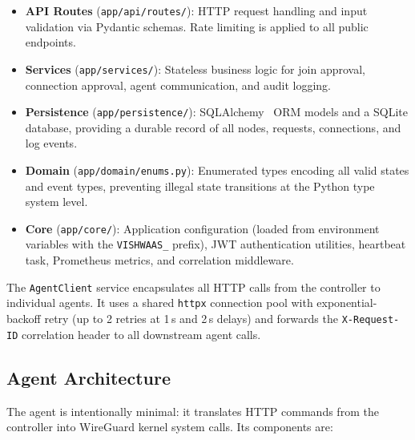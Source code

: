 \documentclass[conference]{IEEEtran}
\begin{document}
\begin{itemize}
  \item \textbf{API Routes} (\texttt{app/api/routes/}): HTTP request handling and
        input validation via Pydantic schemas. Rate limiting is applied to all
        public endpoints.
  \item \textbf{Services} (\texttt{app/services/}): Stateless business logic for
        join approval, connection approval, agent communication, and audit
        logging.
  \item \textbf{Persistence} (\texttt{app/persistence/}):
        SQLAlchemy~\cite{sqlalchemy} ORM models and a SQLite database, providing a
        durable record of all nodes, requests, connections, and log events.
  \item \textbf{Domain} (\texttt{app/domain/enums.py}): Enumerated types encoding
        all valid states and event types, preventing illegal state transitions at
        the Python type system level.
  \item \textbf{Core} (\texttt{app/core/}): Application configuration (loaded from
        environment variables with the \texttt{VISHWAAS\_} prefix), JWT
        authentication utilities, heartbeat task, Prometheus metrics, and
        correlation middleware.
\end{itemize}

The \texttt{AgentClient} service encapsulates all HTTP calls from the controller
to individual agents. It uses a shared \texttt{httpx} connection pool with
exponential-backoff retry (up to 2 retries at 1\,s and 2\,s delays) and forwards
the \texttt{X-Request-ID} correlation header to all downstream agent calls.

\subsection{Agent Architecture}

The agent is intentionally minimal: it translates HTTP commands from the
controller into WireGuard kernel system calls. Its components are:
\end{document}
